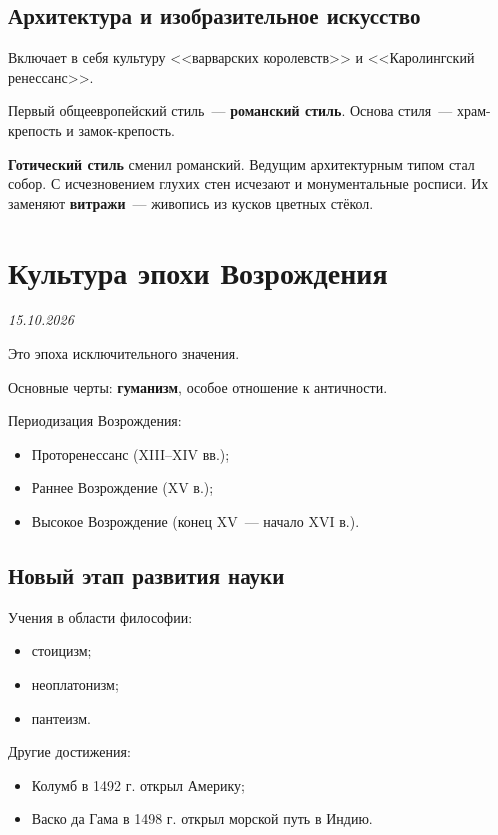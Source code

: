 \documentclass[a4paper, 12pt]{article}
\newcommand{\lecdate}[1]{\vspace{-4pt}\hfill{\small\textit{#1}}\par}
\begin{document}
\subsection{Архитектура и изобразительное искусство}
Включает в себя культуру <<варварских королевств>> и <<Каролингский
ренессанс>>.

Первый общеевропейский стиль~--- \textbf{романский стиль}. Основа стиля~---
храм-крепость и замок-крепость.

\textbf{Готический стиль} сменил романский. Ведущим архитектурным типом стал
собор. С исчезновением глухих стен исчезают и монументальные росписи. Их
заменяют \textbf{витражи}~--- живопись из кусков цветных стёкол.

\section{Культура эпохи Возрождения}
\lecdate{15.10.2026}

Это эпоха исключительного значения.

Основные черты: \textbf{гуманизм}, особое отношение к античности.

Периодизация Возрождения:
\begin{itemize}[noitemsep]
  \item Проторенессанс (XIII--XIV вв.);
  \item Раннее Возрождение (XV в.);
  \item Высокое Возрождение (конец XV~--- начало XVI в.).
\end{itemize}

\subsection{Новый этап развития науки}
Учения в области философии:
\begin{itemize}[noitemsep]
  \item стоицизм;
  \item неоплатонизм;
  \item пантеизм.
\end{itemize}

Другие достижения:
\begin{itemize}[noitemsep]
  \item Колумб в 1492 г. открыл Америку;
  \item Васко да Гама в 1498 г. открыл морской путь в Индию.
\end{itemize}
\end{document}
